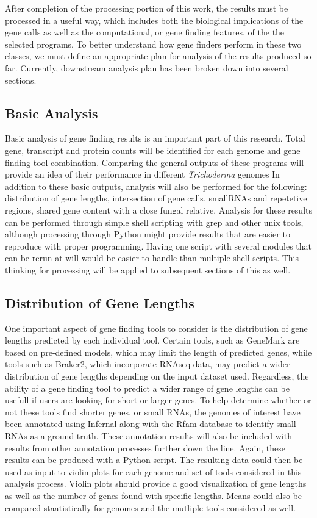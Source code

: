 \documentclass[12pt]{article}
\begin{document}
After completion of the processing portion of this work, the results
must be processed in a useful way, which includes both the biological
implications of the gene calls as well as the computational, or gene
finding features, of the the selected programs. To better understand
how gene finders perform in these two classes, we must define an
appropriate plan for analysis of the results produced so
far. Currently, downstream analysis plan has been broken down into
several sections.

\subsection{Basic Analysis}

Basic analysis of gene finding results is an important part of this
research. Total gene, transcript and protein counts will be identified
for each genome and gene finding tool combination. Comparing the
general outputs of these programs will provide an idea of their
performance in different \textit{Trichoderma} genomes In addition to
these basic outputs, analysis will also be performed for the
following: distribution of gene lengths, intersection of gene calls,
smallRNAs and repetetive regions, shared gene content with a close
fungal relative. Analysis for these results can be performed through
simple shell scripting with grep and other unix tools, although
processing through Python might provide results that are easier to
reproduce with proper programming. Having one script with several
modules that can be rerun at will would be easier to handle than
multiple shell scripts. This thinking for processing will be applied
to subsequent sections of this as well.

\subsection{Distribution of Gene Lengths}

One important aspect of gene finding tools to consider is the
distribution of gene lengths predicted by each individual
tool. Certain tools, such as GeneMark are based on pre-defined models,
which may limit the length of predicted genes, while tools such as
Braker2, which incorporate RNAseq data, may predict a wider
distribution of gene lengths depending on the input dataset
used. Regardless, the ability of a gene finding tool to predict a
wider range of gene lengths can be usefull if users are looking for
short or larger genes. To help determine whether or not these tools
find shorter genes, or small RNAs, the genomes of interest have been
annotated using Infernal along with the Rfam database to identify
small RNAs as a ground truth. These annotation results will also be
included with results from other annotation processes further down the
line. Again, these results can be produced with a Python script. The
resulting data could then be used as input to violin plots for each
genome and set of tools considered in this analysis process. Violin
plots should provide a good visualization of gene lengths as well as
the number of genes found with specific lengths. Means could also be
compared staatistically for genomes and the mutliple tools considered
as well.
\end{document}
